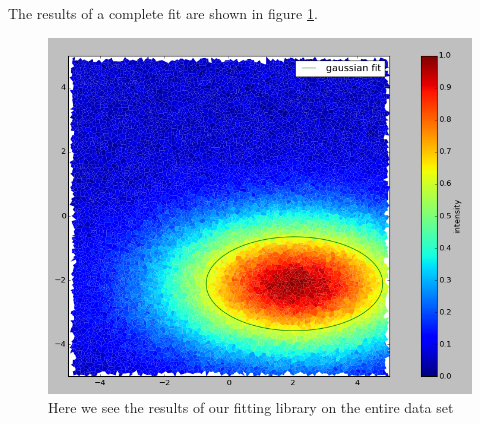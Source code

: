 \documentclass{article}
\begin{document}
The results of a complete fit are shown in figure \ref{fig_fit}. 

\begin{figure}
\includegraphics[width=1.0\textwidth]{randomSamples_whole.png}
\caption{Here we see the results of our fitting library on the entire data set}
\label{fig_fit}
\end{figure}


 
\end{document}
